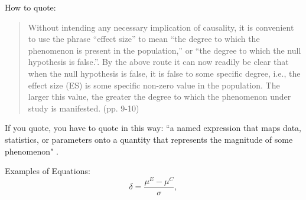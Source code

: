 How to quote: 

\begin{quote}
	Without intending any necessary implication of causality, it is convenient to use the phrase “effect size” to mean “the degree to which the phenomenon is present in the population,” or “the degree to which the null hypothesis is false.”. By the above route it can now readily be clear that when the null hypothesis is false, it is false to some specific degree, i.e., the effect size (ES) is some specific non-zero value in the population. The larger this value, the greater the degree to which the phenomenon under study is manifested. (pp. 9-10)
\end{quote}
 If you quote, you have to quote in this way: ``a named expression that maps data, statistics, or parameters onto a quantity that represents the magnitude of some phenomenon" \cite[p.141]{kelley2012effect}. 
 
Examples of Equations:
\begin{equation}
\delta = \frac{\mu^E - \mu^C}{\sigma},
\label{pop_smd}
\end{equation}
 